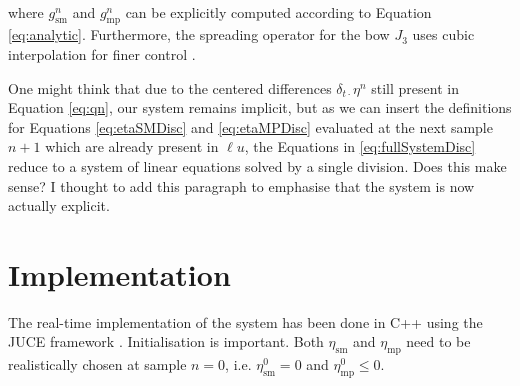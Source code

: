 \documentclass[dvipsnames, pdftex]{article}
\def\SWcomment[#1]{\textcolor{Bittersweet}{#1}}
\begin{document}
\\
where $g^n_\text{sm}$ and $g^n_\text{mp}$ can be explicitly computed according to Equation \eqref{eq:analytic}. Furthermore, the spreading operator for the bow $J_3$ uses cubic interpolation for finer control \cite{Bilbao2009:NumericalSoundSynthesis}. 

One might think that due to the centered differences $\delta_{t\cdot}\eta^n$ still present in Equation \eqref{eq:qn}, our system remains implicit, but as we can insert the definitions for Equations \eqref{eq:etaSMDisc} and \eqref{eq:etaMPDisc} evaluated at the next sample $n+1$ which are already present in $\ell u$, the Equations in \eqref{eq:fullSystemDisc} reduce to a system of linear equations solved by a single division. \SWcomment[Does this make sense? I thought to add this paragraph to emphasise that the system is now actually explicit.]{}
\section{Implementation}
The real-time implementation of the system has been done in C++ using the JUCE framework \cite{JUCE2020}.
Initialisation is important. Both $\eta_\text{sm}$ and $\eta_\text{mp}$ need to be realistically chosen at sample $n=0$, i.e. $\eta_\text{sm}^0 = 0$ and $\eta_\text{mp}^0 \leq 0$.
\end{document}
